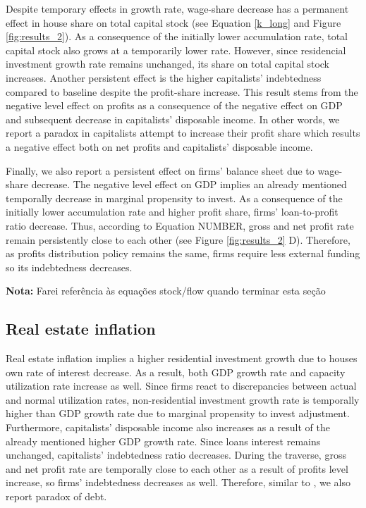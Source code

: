 \documentclass[11pt]{article}
\begin{document}
Despite temporary effects in growth rate, wage-share decrease has a permanent effect in house share on total capital stock (see Equation \ref{k_long} and Figure \ref{fig:results_2}).
As a consequence of the initially lower accumulation rate, total capital stock also grows at a temporarily lower rate.
However, since residencial investment growth rate remains unchanged, its share on total capital stock increases.
Another persistent effect is the higher capitalists' indebtedness compared to baseline despite the profit-share increase.
This result stems from the negative level effect on profits as a consequence of the negative effect on GDP and subsequent decrease in capitalists' disposable income.
In other words, we report a paradox in capitalists attempt to increase their profit share which results a negative effect both on net profits and capitalists' disposable income.

Finally, we also report a persistent effect on firms' balance sheet due to wage-share decrease.
The negative level effect on GDP implies an already mentioned temporally decrease in marginal propensity to invest.
As a consequence of the initially lower accumulation rate and higher profit share, firms' loan-to-profit ratio decrease.
Thus, according to Equation NUMBER, gross and net profit rate remain persistently close to each other (see Figure \ref{fig:results_2} D).
Therefore, as profits distribution policy remains the same, firms require less external funding so its indebtedness decreases.

\textbf{Nota:} Farei referência às equações stock/flow quando terminar esta seção

\subsection{Real estate inflation}
\label{sec:org7fe9be9}
\label{sec:Exp2}


Real estate inflation implies a higher residential investment growth due to houses own rate of interest decrease.
As a result, both GDP growth rate and capacity utilization rate increase as well.
Since firms react to discrepancies between actual and normal utilization rates, non-residential investment growth rate 
is temporally higher than GDP growth rate due to marginal propensity to invest adjustment.
Furthermore, capitalists' disposable income also increases as a result of the already mentioned higher GDP growth rate.
Since loans interest remains unchanged, capitalists' indebtedness ratio decreases.
During the traverse, gross and net profit rate are temporally close to each other as a result of profits level increase, so firms' indebtedness decreases as well.
Therefore, similar to \textcite{mandarino-2020-worker-debt}, we also report paradox of debt.
\end{document}
